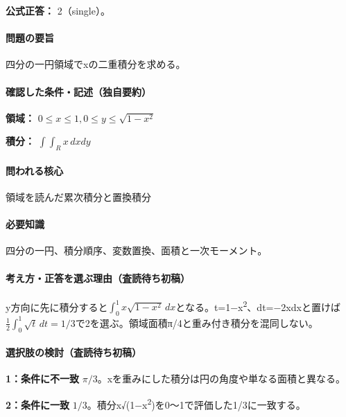 \textbf{公式正答：} 2（single）。

\paragraph{問題の要旨} 四分の一円領域でxの二重積分を求める。

\paragraph{確認した条件・記述（独自要約）}\mbox{}\par

\noindent\textbf{領域：} \(0\le x\le1,0\le y\le\sqrt{1-x^2}\)\par

\noindent\textbf{積分：} \(\int\int_R x\,dxdy\)\par

\paragraph{問われる核心} 領域を読んだ累次積分と置換積分

\paragraph{必要知識} 四分の一円、積分順序、変数置換、面積と一次モーメント。

\paragraph{考え方・正答を選ぶ理由（査読待ち初稿）} y方向に先に積分すると\(\int_0^1x\sqrt{1-x^2}\,dx\)となる。t=\allowbreak{}1−x\textsuperscript{2}、dt=−2xdxと置けば\(\frac12\int_0^1\sqrt t\,dt=1/3\)で2を選ぶ。領域面積π/4と重み付き積分を混同しない。

\paragraph{選択肢の検討（査読待ち初稿）}\mbox{}\par

\noindent\textbf{1：条件に不一致} \(\pi/3\)。xを重みにした積分は円の角度や単なる面積と異なる。\par

\noindent\textbf{2：条件に一致} \(1/3\)。積分x√(1−x\textsuperscript{2})を0〜1で評価した1/3に一致する。\par

